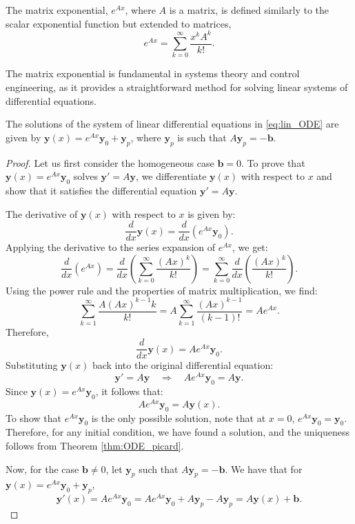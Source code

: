 \begin{definition}
The matrix exponential, $ e^{Ax} $, where $ A $ is a matrix, is defined similarly to the scalar exponential function but extended to matrices,    
\[
e^{Ax} = \sum_{k=0}^{\infty} \frac{x^k A^k}{k!}.
\]
\end{definition}
The matrix exponential is fundamental in systems theory and control engineering, as it provides a straightforward method for solving linear systems of differential equations.

\begin{proposition}
    The solutions of the system of linear differential equations in \eqref{eq:lin_ODE} are given by $ \mathbf{y}(x) = e^{Ax} \mathbf{y}_0 + \mathbf{y}_p$, where $\mathbf{y}_p$ is such that $A\mathbf{y}_p = -\mathbf{b}$.
\end{proposition}

\begin{proof}
    Let us first consider the homogeneous case $ \mathbf{b} = 0 $. To prove that $ \mathbf{y}(x) = e^{Ax} \mathbf{y}_0 $ solves $ \mathbf{y}' = A \mathbf{y} $, we differentiate $ \mathbf{y}(x) $ with respect to $ x $ and show that it satisfies the differential equation $\mathbf{y}' = A \mathbf{y}$.

    The derivative of $ \mathbf{y}(x) $ with respect to $ x $ is given by:
   \[
   \frac{d}{dx} \mathbf{y}(x) = \frac{d}{dx} \left(e^{Ax} \mathbf{y}_0\right).
   \]
   Applying the derivative to the series expansion of $ e^{Ax} $, we get:
   \[
   \frac{d}{dx} \left(e^{Ax}\right) = \frac{d}{dx} \left( \sum_{k=0}^{\infty} \frac{(Ax)^k}{k!} \right) = \sum_{k=0}^{\infty} \frac{d}{dx} \left( \frac{(Ax)^k}{k!} \right).
   \]
   Using the power rule and the properties of matrix multiplication, we find:
   \[
   \sum_{k=1}^{\infty} \frac{A (Ax)^{k-1} k}{k!} = A \sum_{k=1}^{\infty} \frac{(Ax)^{k-1}}{(k-1)!} = A e^{Ax}.
   \]
   Therefore,
   \[
   \frac{d}{dx} \mathbf{y}(x) = A e^{Ax} \mathbf{y}_0.
   \]
Substituting $ \mathbf{y}(x) $ back into the original differential equation:
   \[
   \mathbf{y}' = A \mathbf{y} \quad \Rightarrow \quad A e^{Ax} \mathbf{y}_0 = A \mathbf{y}.
   \]
   Since $ \mathbf{y}(x) = e^{Ax} \mathbf{y}_0 $, it follows that:
   \[
   A e^{Ax} \mathbf{y}_0 = A \mathbf{y}(x).
   \]
To show that $e^{Ax} \mathbf{y}_0$ is the only possible solution, note that at $x=0$, $e^{Ax} \mathbf{y}_0 = \mathbf{y}_0$. Therefore, for any initial condition, we have found a solution, and the uniqueness follows from Theorem \ref{thm:ODE_picard}.

Now, for the case $\mathbf{b} \neq 0 $, let $\mathbf{y}_p$ such that $A \mathbf{y}_p = -\mathbf{b}$. We have that for $ \mathbf{y}(x) = e^{Ax} \mathbf{y}_0 + \mathbf{y}_p$, 
\begin{equation*}
\mathbf{y}'(x) = A e^{Ax} \mathbf{y}_0 = A e^{Ax} \mathbf{y}_0 + A\mathbf{y}_p - A\mathbf{y}_p = A \mathbf{y}(x) + \mathbf{b}.
\end{equation*}
\end{proof}


